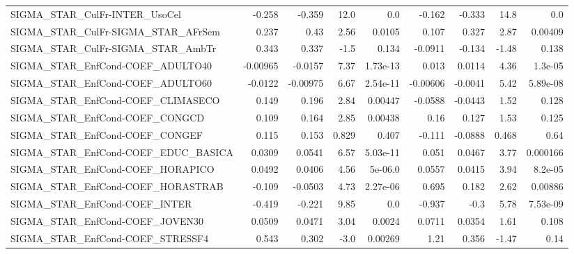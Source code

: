 \begin{tabular}{lrrrrrrrr}
SIGMA\_STAR\_CulFr-INTER\_UsoCel         &      -0.258 &       -0.359 &     12.0 &      0.0 &     -0.162 &      -0.333 &         14.8 &           0.0 \\
SIGMA\_STAR\_CulFr-SIGMA\_STAR\_AFrSem    &       0.237 &         0.43 &     2.56 &   0.0105 &      0.107 &       0.327 &         2.87 &       0.00409 \\
SIGMA\_STAR\_CulFr-SIGMA\_STAR\_AmbTr     &       0.343 &        0.337 &     -1.5 &    0.134 &    -0.0911 &      -0.134 &        -1.48 &         0.138 \\
SIGMA\_STAR\_EnfCond-COEF\_ADULTO40      &    -0.00965 &      -0.0157 &     7.37 & 1.73e-13 &      0.013 &      0.0114 &         4.36 &       1.3e-05 \\
SIGMA\_STAR\_EnfCond-COEF\_ADULTO60      &     -0.0122 &     -0.00975 &     6.67 & 2.54e-11 &   -0.00606 &     -0.0041 &         5.42 &      5.89e-08 \\
SIGMA\_STAR\_EnfCond-COEF\_CLIMASECO     &       0.149 &        0.196 &     2.84 &  0.00447 &    -0.0588 &     -0.0443 &         1.52 &         0.128 \\
SIGMA\_STAR\_EnfCond-COEF\_CONGCD        &       0.109 &        0.164 &     2.85 &  0.00438 &       0.16 &       0.127 &         1.53 &         0.125 \\
SIGMA\_STAR\_EnfCond-COEF\_CONGEF        &       0.115 &        0.153 &    0.829 &    0.407 &     -0.111 &     -0.0888 &        0.468 &          0.64 \\
SIGMA\_STAR\_EnfCond-COEF\_EDUC\_BASICA   &      0.0309 &       0.0541 &     6.57 & 5.03e-11 &      0.051 &      0.0467 &         3.77 &      0.000166 \\
SIGMA\_STAR\_EnfCond-COEF\_HORAPICO      &      0.0492 &       0.0406 &     4.56 &  5e-06.0 &     0.0557 &      0.0415 &         3.94 &       8.2e-05 \\
SIGMA\_STAR\_EnfCond-COEF\_HORASTRAB     &      -0.109 &      -0.0503 &     4.73 & 2.27e-06 &      0.695 &       0.182 &         2.62 &       0.00886 \\
SIGMA\_STAR\_EnfCond-COEF\_INTER         &      -0.419 &       -0.221 &     9.85 &      0.0 &     -0.937 &        -0.3 &         5.78 &      7.53e-09 \\
SIGMA\_STAR\_EnfCond-COEF\_JOVEN30       &      0.0509 &       0.0471 &     3.04 &   0.0024 &     0.0711 &      0.0354 &         1.61 &         0.108 \\
SIGMA\_STAR\_EnfCond-COEF\_STRESSF4      &       0.543 &        0.302 &     -3.0 &  0.00269 &       1.21 &       0.356 &        -1.47 &          0.14 \\

\end{tabular}

